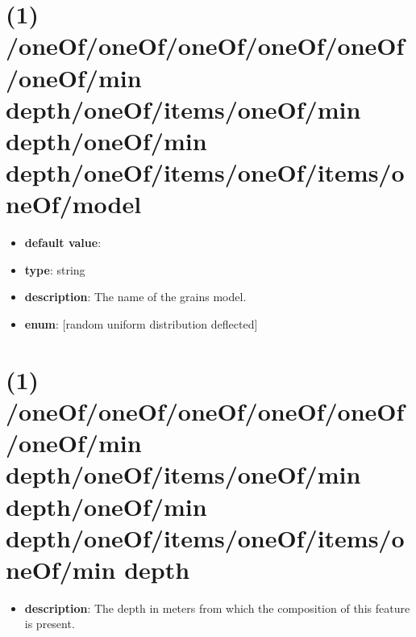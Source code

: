\section{(1) /oneOf/oneOf/oneOf/oneOf/oneOf/oneOf/min depth/oneOf/items/oneOf/min depth/oneOf/min depth/oneOf/items/oneOf/items/oneOf/model}
\begin{itemize}[leftmargin=1em]\item {\bf default value}: 
\item {\bf type}: string
\item {\bf description}: The name of the grains model.
\item {\bf enum}: [random uniform distribution deflected]\end{itemize}\section{(1) /oneOf/oneOf/oneOf/oneOf/oneOf/oneOf/min depth/oneOf/items/oneOf/min depth/oneOf/min depth/oneOf/items/oneOf/items/oneOf/min depth}
\begin{itemize}[leftmargin=1em]\item {\bf description}: The depth in meters from which the composition of this feature is present.
\end{itemize}
